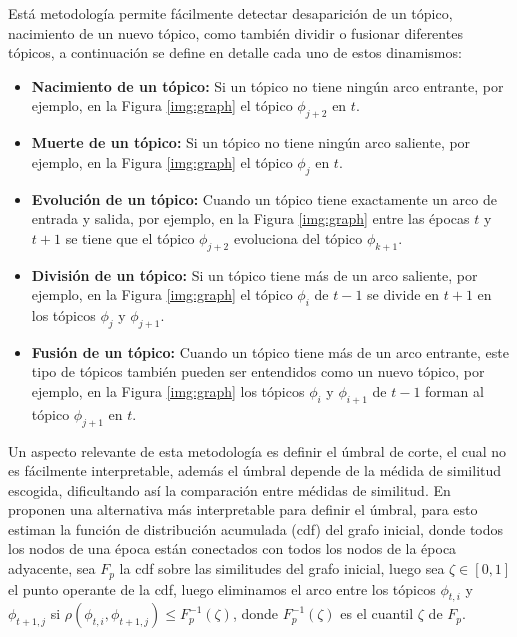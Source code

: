\documentclass[letterpaper,12pt,oneside]{book} %
\begin{document}
Está metodología permite fácilmente detectar desaparición de un tópico, nacimiento de un nuevo tópico, como también dividir o fusionar diferentes tópicos, a continuación se define en detalle cada uno de estos dinamismos:

\begin{itemize}
    \item \textbf{Nacimiento de un tópico:} Si un tópico no tiene ningún arco entrante, por ejemplo, en la Figura \ref{img:graph} el tópico $\phi_{j+2}$ en $t$.
    \item \textbf{Muerte de un tópico:} Si un tópico no tiene ningún arco saliente, por ejemplo, en la Figura \ref{img:graph} el tópico $\phi_{j}$ en $t$.
    \item \textbf{Evolución de un tópico:} Cuando un tópico tiene exactamente un arco de entrada y salida, por ejemplo, en la Figura \ref{img:graph} entre las épocas $t$ y $t+1$ se tiene que el tópico $\phi_{j+2}$ evoluciona del tópico $\phi_{k+1}$.
    \item \textbf{División de un tópico:} Si un tópico tiene más de un arco saliente, por ejemplo, en la Figura \ref{img:graph} el tópico $\phi_{i}$ de $t-1$ se divide en $t+1$ en los tópicos $\phi_{j}$ y $\phi_{j+1}$.
    \item \textbf{Fusión de un tópico:} Cuando un tópico tiene más de un arco entrante, este tipo de tópicos también pueden ser entendidos como un nuevo tópico, por ejemplo, en la Figura \ref{img:graph} los tópicos $\phi_{i}$ y $\phi_{i+1}$ de $t-1$ forman al tópico $\phi_{j+1}$ en $t$.
\end{itemize}

Un aspecto relevante de esta metodología es definir el úmbral de corte, el cual no es fácilmente interpretable, además el úmbral depende de la médida de similitud escogida, dificultando así la comparación entre médidas de similitud. En \cite{beykikhoshk2018discovering} proponen una alternativa más interpretable para definir el úmbral, para esto estiman la función de distribución acumulada (cdf) del grafo inicial, donde todos los nodos de una época están conectados con todos los nodos de la época adyacente, sea $F_{p}$ la cdf sobre las similitudes del grafo inicial, luego sea $\zeta \in [0,1]$ el punto operante de la cdf, luego eliminamos el arco entre los tópicos $\phi_{t,i}$ y $\phi_{t+1,j}$ si $\rho(\phi_{t,i}, \phi_{t+1,j})\leq F_{p}^{-1}(\zeta)$, donde  $F_{p}^{-1}(\zeta)$ es el cuantil $\zeta$ de $F_{p}$.
\end{document}
